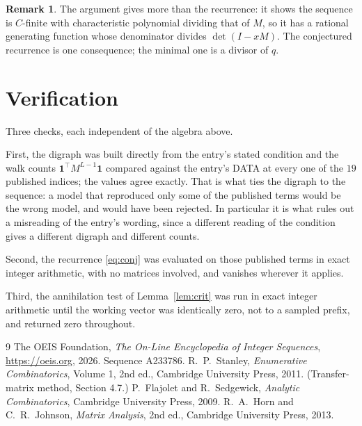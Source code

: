\documentclass[11pt,a4paper]{article}
\theoremstyle{plain}
\theoremstyle{definition}
\newtheorem{remark}[theorem]{Remark}
\begin{document}
\begin{remark}
The argument gives more than the recurrence: it shows the sequence is $C$-finite with
characteristic polynomial dividing that of $M$, so it has a rational generating function
whose denominator divides $\det(I-xM)$. The conjectured recurrence is one consequence; the
minimal one is a divisor of $q$.
\end{remark}

\section{Verification}

Three checks, each independent of the algebra above.

First, the digraph was built directly from the entry's stated condition and the walk counts
$\mathbf{1}^{\!\top}M^{L-1}\mathbf{1}$ compared against the entry's DATA at
every one of the $19$ published indices; the values agree exactly. That is what ties
the digraph to the sequence: a model that reproduced only some of the published terms would
be the wrong model, and would have been rejected. In particular it is what rules out a
misreading of the entry's wording, since a different reading of the condition gives a
different digraph and different counts.

Second, the recurrence \eqref{eq:conj} was evaluated on those published terms in exact
integer arithmetic, with no matrices involved, and vanishes wherever it applies.

Third, the annihilation test of Lemma~\ref{lem:crit} was run in exact integer arithmetic
until the working vector was identically zero, not to a sampled prefix, and returned zero
throughout.

\begin{thebibliography}{9}
 The OEIS Foundation, \emph{The On-Line Encyclopedia of Integer
Sequences}, \url{https://oeis.org}, 2026. Sequence A233786.
 R.~P.~Stanley, \emph{Enumerative Combinatorics}, Volume 1, 2nd ed.,
Cambridge University Press, 2011. (Transfer-matrix method, Section 4.7.)
 P.~Flajolet and R.~Sedgewick, \emph{Analytic Combinatorics}, Cambridge
University Press, 2009.
 R.~A.~Horn and C.~R.~Johnson, \emph{Matrix Analysis}, 2nd ed., Cambridge
University Press, 2013.
\end{thebibliography}
\end{document}

